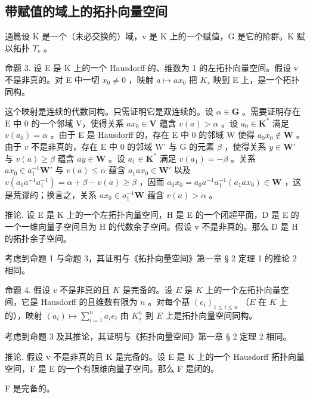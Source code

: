 \subsection{带赋值的域上的拓扑向量空间}

通篇设 K 是一个（未必交换的）域，v 是 K 上的一个赋值，G 是它的阶群。K 赋以拓扑 \(T_{v}\) 。

命题 3. 设 E 是 K 上的一个 Hausdorff 的、维数为 1 的左拓扑向量空间。假设 v 不是非真的。对 E 中一切 \(x_{0} \neq 0\) ，映射 \(a \mapsto ax_{0}\) 把 \(K_{s}\) 映到 E 上，是一个拓扑同构。

这个映射是连续的代数同构。只需证明它是双连续的。设 \(\alpha \in \mathbf{G}\) 。需要证明存在 E 中 0 的一个邻域 V，使得关系 \(ax_0 \in \mathbf{V}\) 蕴含 \(v(a) > \alpha\) 。设 \(a_0 \in \mathbf{K}^*\) 满足 \(v(a_0) = \alpha\) 。由于 E 是 Hausdorff 的，存在 E 中 0 的邻域 W 使得 \(a_0 x_0 \notin \mathbf{W}\) 。由于 \(v\) 不是非真的，存在 E 中 0 的邻域 W' 与 G 的元素 \(\beta\) ，使得关系 \(y \in \mathbf{W}'\) 与 \(v(a) \geqslant \beta\) 蕴含 \(ay \in \mathbf{W}\) 。设 \(a_1 \in \mathbf{K}^*\) 满足 \(v(a_1) = -\beta\) 。关系 \(ax_0 \in a_1^{-1} \mathbf{W}'\) 与 \(v(a) \leqslant \alpha\) 蕴含 \(a_1 ax_0 \in \mathbf{W}'\) 以及 \(v(a_0 a^{-1} a_1^{-1}) = \alpha + \beta - v(a) \geqslant \beta\) ，因而 \(a_0 x_0 = a_0 a^{-1} a_1^{-1}(a_1 ax_0) \in \mathbf{W}\) ，这是荒谬的；换言之，关系 \(ax_0 \in a_1^{-1} \mathbf{W}\) 蕴含 \(v(a) > \alpha\) 。

推论. 设 E 是 K 上的一个左拓扑向量空间，H 是 E 的一个闭超平面，D 是 E 的一个一维向量子空间且为 H 的代数余子空间。假设 v 不是非真的。那么 D 是 H 的拓扑余子空间。

考虑到命题 1 与命题 3，其证明与《拓扑向量空间》第一章 § 2 定理 1 的推论 2 相同。

命题 4. 假设 \(v\) 不是非真的且 \(K\) 是完备的。设 \(E\) 是 \(K\) 上的一个左拓扑向量空间，它是 Hausdorff 的且维数有限为 \(n\) 。对每个基 \((e_i)_{1 \leqslant i \leqslant n}\) （\(E\) 在 \(K\) 上的），映射 \((a_i) \mapsto \sum_{i=1}^{n} a_i e_i\) 由 \(K_s^n\) 到 \(E\) 上是拓扑向量空间同构。

考虑到命题 3 及其推论，其证明与《拓扑向量空间》第一章 § 2 定理 2 相同。

推论. 假设 v 不是非真的且 K 是完备的。设 E 是 K 上的一个 Hausdorff 拓扑向量空间，F 是 E 的一个有限维向量子空间。那么 F 是闭的。

F 是完备的。


